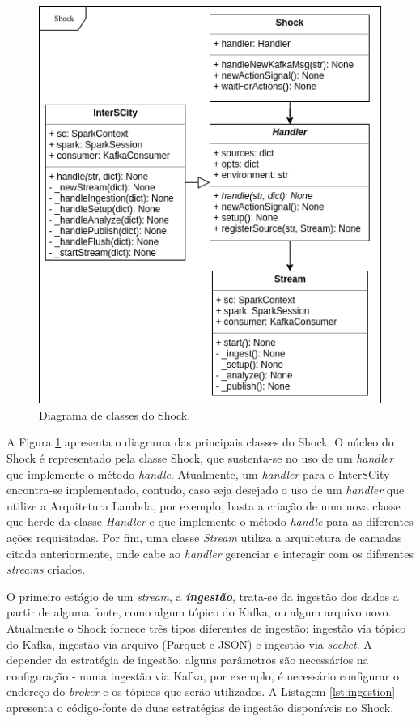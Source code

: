 \begin{figure}[hbt]
  \centering
    \includegraphics[scale=0.5]{figuras/ShockUML.png}
  \caption{Diagrama de classes do Shock.}
  \label{fig:uml}
\end{figure}

A Figura \ref{fig:uml} apresenta o diagrama das principais classes do Shock. O
núcleo do Shock é representado pela classe Shock, que sustenta-se no uso de um
\textit{handler} que implemente o método \textit{handle}. Atualmente, um
\textit{handler} para o InterSCity encontra-se implementado, contudo, caso
seja desejado o uso de um \textit{handler} que utilize a Arquitetura Lambda, por
exemplo, basta a criação de uma nova classe que herde da classe
\textit{Handler} e que implemente o método \textit{handle} para as diferentes
ações requisitadas. Por fim, uma classe \textit{Stream} utiliza a arquitetura
de camadas citada anteriormente, onde cabe ao \textit{handler} gerenciar e
interagir com os diferentes \textit{streams} criados.



O primeiro estágio de um \textit{stream}, a \textit{\textbf{ingestão}}, trata-se da
ingestão dos dados a partir de alguma fonte, como algum tópico do Kafka, ou
algum arquivo novo. Atualmente o Shock fornece três tipos diferentes de
ingestão: ingestão via tópico do Kafka, ingestão via arquivo (Parquet e JSON)
e ingestão via \textit{socket}. A depender da estratégia de ingestão, alguns
parâmetros são necessários na configuração - numa ingestão via Kafka, por
exemplo, é necessário configurar o endereço do \textit{broker} e os tópicos
que serão utilizados. A Listagem \ref{lst:ingestion} apresenta o código-fonte
de duas estratégias de ingestão disponíveis no Shock.

